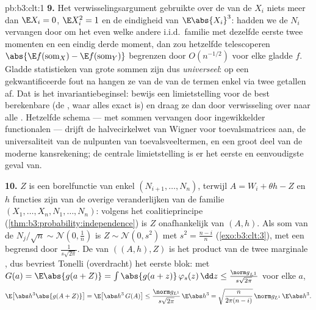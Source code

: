 \begin{solution}{pb:b3:clt:1}
\textbf{9.} Het verwisselingsargument gebruikte over de
 van de $X_i$ niets meer dan $\E X_i = 0$, $\E
X_i^2 = 1$ en de eindigheid van $\E\abs{X_i}^3$: hadden we
de  $N_i$ vervangen door om het even welke andere
i.i.d.\ familie met dezelfde eerste twee momenten en een
eindig derde moment, dan zou hetzelfde telescoperen
$\abs{\E f(\text{som}_X) - \E f(\text{som}_Y)}$ begrenzen
door $O(n^{-1/2})$ voor elke gladde $f$. Gladde
statistieken van grote  sommen zijn dus
\emph{universeel}: op een gekwantificeerde fout na hangen
ze van de  van de termen enkel via twee getallen
af. Dat is het invariantiebeginsel: bewijs een
limietstelling voor de best berekenbare  (de
, waar alles exact is) en draag ze dan door
verwisseling over naar alle . Hetzelfde schema
--- met sommen vervangen door ingewikkelder functionalen
--- drijft de halvecirkelwet van Wigner voor toevalsmatrices
aan, de universaliteit van de nulpunten van
toevalsveeltermen, en een groot deel van de moderne
kansrekening; de centrale limietstelling is er het eerste
en eenvoudigste geval van.

\textbf{10.} $Z$ is een borelfunctie van enkel $(N_{i+1},
\dots, N_n)$, terwijl $A = W_i + \theta h - Z$ en $h$
functies zijn van de overige veranderlijken van de
 familie $(X_1, \dots, X_n, N_1, \dots,
N_n)$: volgens het coalitieprincipe
(\cref{thm:b3:probability:independence}) is $Z$
onafhankelijk van $(A, h)$. Als som van de 
$N_j/\sqrt n \sim \mathcal N(0, \frac1n)$ is $Z \sim
\mathcal N(0, s^2)$ met $s^2 = \frac{n-i}n$
(\cref{exo:b3:clt:3}), met een  begrensd door
$\frac1{s\sqrt{2\pi}}$. De  van $((A, h), Z)$ is
het product van de twee marginale , dus bevriest
Tonelli (overdracht) het eerste blok: met $G(a) =
\E\abs{g(a + Z)} = \int\abs{g(a + z)}\,\varphi_s(z)\,\dd z
\leq \frac{\norm g_{L^1}}{s\sqrt{2\pi}}$ voor elke $a$,
\[
\E\bigl[\abs h^3\abs{g(A + Z)}\bigr] =
\E\bigl[\abs h^3\,G(A)\bigr] \leq
\frac{\norm g_{L^1}}{s\sqrt{2\pi}}\,\E\abs h^3
= \sqrt{\frac{n}{2\pi(n-i)}}\,\norm g_{L^1}\,\E\abs h^3 .
\]


\end{solution}
